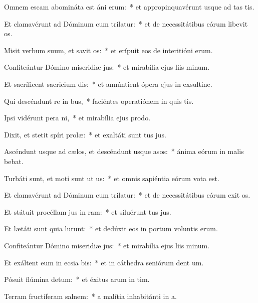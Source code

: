 \item Omnem escam abomináta est áni erum:~* et appropinquavérunt usque ad tas tis.
\item Et clamavérunt ad Dóminum cum trilatur:~* et de necessitátibus eórum libevit os.
\item Misit verbum suum, et savit os:~* et erípuit eos de interitióni erum.
\item Confiteántur Dómino miseridiæ jus:~* et mirabília ejus liis minum.
\item Et sacríficent sacricium dis:~* et annúntient ópera ejus in exsultine.
\item Qui descéndunt re in bus,~* faciéntes operatiónem in quis tis.
\item Ipsi vidérunt pera ni,~* et mirabília ejus  prodo.
\item Dixit, et stetit spíri prolæ:~* et exaltáti sunt tus jus.
\item Ascéndunt usque ad cælos, et descéndunt usque  asos:~* ánima eórum in malis bebat.
\item Turbáti sunt, et moti sunt ut us:~* et omnis sapiéntia eórum vota est.
\item Et clamavérunt ad Dóminum cum trilatur:~* et de necessitátibus eórum exit os.
\item Et státuit procéllam jus in ram:~* et siluérunt tus jus.
\item Et lætáti sunt quia lurunt:~* et dedúxit eos in portum voluntis erum.
\item Confiteántur Dómino miseridiæ jus:~* et mirabília ejus liis minum.
\item Et exáltent eum in ecsia bis:~* et in cáthedra seniórum dent um.
\item Pósuit flúmina  detum:~* et éxitus arum in tim.
\item Terram fructíferam  salnem:~* a malítia inhabitánti in a.
